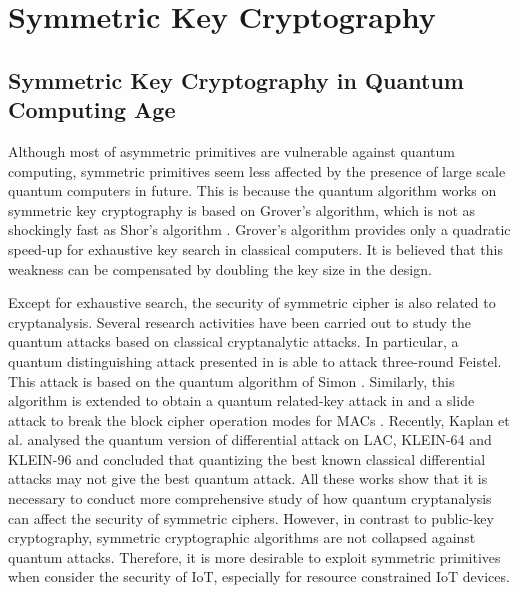 \documentclass[preprint,10pt,5p]{elsarticle}
\begin{document}
\section{Symmetric Key Cryptography}
\subsection{Symmetric Key Cryptography in Quantum Computing Age}
\noindent Although most of asymmetric primitives are vulnerable against quantum computing, symmetric primitives seem less affected by the presence of large scale quantum computers in future. This is because the quantum algorithm works on symmetric key cryptography is based on Grover’s algorithm, which is not as shockingly fast as Shor’s algorithm \cite{bernstein2009}.  Grover’s algorithm \cite{grover1996} provides only a quadratic speed-up for exhaustive key search in classical computers. It is believed that this weakness can be compensated by doubling the key size in the design. 

Except for exhaustive search, the security of symmetric cipher is also related to cryptanalysis. Several research activities have been carried out to study the quantum attacks based on classical cryptanalytic attacks. In particular, a quantum distinguishing attack presented in \cite{kuwakado2010} is able to attack three-round Feistel. This attack is based on the quantum algorithm of Simon \cite{simon1997}. Similarly, this algorithm is extended to obtain a quantum related-key attack in \cite{roetteler2015} and a slide attack to break the block cipher operation modes for MACs \cite{kaplan2016}. Recently, Kaplan et al. \cite{kaplan2015} analysed the quantum version of differential attack on LAC, KLEIN-64 and KLEIN-96 and concluded that quantizing the best known classical differential attacks may not give the best quantum attack. All these works show that it is necessary to conduct more comprehensive study of how quantum cryptanalysis can affect the security of symmetric ciphers. However, in contrast to public-key cryptography, symmetric cryptographic algorithms are not collapsed against quantum attacks. Therefore, it is more desirable to exploit symmetric primitives when consider the security of IoT, especially for resource constrained IoT devices. 
\end{document}
